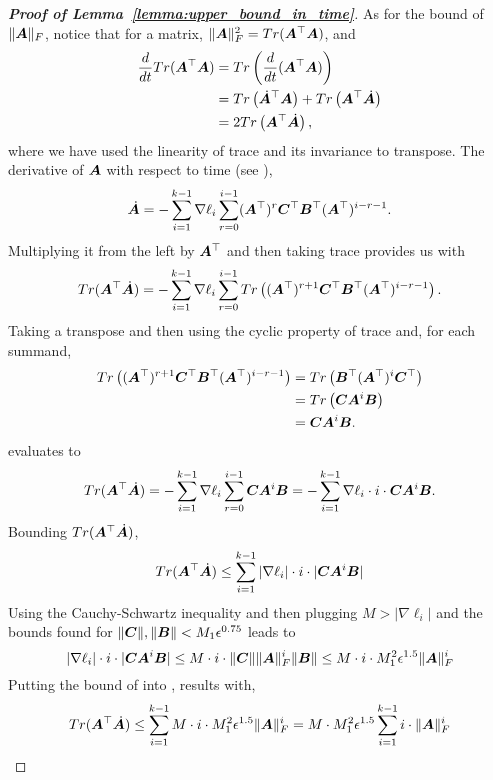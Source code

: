 \begin{proof}[\textbf{Proof of Lemma~\ref{lemma:upper_bound_in_time}}]
As for the bound of $\|{\bm{A}}\|_F$, notice that for a matrix, $\|{\bm{A}}\|_F^2=Tr({\bm{A}}^\top {\bm{A}})$, and
\begin{align}
    \frac{d}{dt}Tr({\bm{A}}^\top {\bm{A}})& =Tr\left(\frac{d}{dt}({\bm{A}}^\top {\bm{A}})\right)\\
    & =Tr\left(\dot{{\bm{A}}}^\top {\bm{A}}\right) + Tr\left({\bm{A}}^\top \dot{{\bm{A}}}\right)\\
    & =2Tr\left( {\bm{A}}^\top \dot{{\bm{A}}} \right),
\end{align}
where we have used the linearity of trace and its invariance to transpose.
The derivative of ${\bm{A}}$ with respect to time (see ),
\begin{equation}
    \dot{{\bm{A}}}=-\sum_{i=1}^{k-1}\nabla\ell_i\sum_{r=0}^{i-1}({\bm{A}}^\top)^r{\bm{C}}^\top {\bm{B}}^\top({\bm{A}}^\top)^{i-r-1}.
\end{equation}
Multiplying it from the left by ${\bm{A}}^\top$ and then taking trace provides us with
\begin{equation}\label{eq:A_trace_deriv}
    Tr({\bm{A}}^\top \dot{{\bm{A}}})=-\sum_{i=1}^{k-1}\nabla\ell_i\sum_{r=0}^{i-1}Tr\left(({\bm{A}}^\top)^{r+1}{\bm{C}}^\top {\bm{B}}^\top({\bm{A}}^\top)^{i-r-1}\right).
\end{equation}
Taking a transpose and then using the cyclic property of trace and, for each summand,
\begin{align}
    Tr\left(({\bm{A}}^\top)^{r+1}{\bm{C}}^\top {\bm{B}}^\top({\bm{A}}^\top)^{i-r-1}\right)&=Tr\left({\bm{B}}^\top ({\bm{A}}^\top)^{i}{\bm{C}}^\top \right)\\
    & =Tr\left({\bm{C}}{\bm{A}}^i{\bm{B}}\right)\\
    & ={\bm{C}}{\bm{A}}^i{\bm{B}}.
\end{align}
 evaluates to
\begin{equation}
    Tr({\bm{A}}^\top \dot{{\bm{A}}})=-\sum_{i=1}^{k-1}\nabla\ell_i\sum_{r=0}^{i-1}{\bm{C}}{\bm{A}}^i{\bm{B}} = -\sum_{i=1}^{k-1}\nabla\ell_i \cdot i\cdot {\bm{C}}{\bm{A}}^i{\bm{B}}.
\end{equation}
Bounding $Tr({\bm{A}}^\top \dot{{\bm{A}}})$,
\begin{equation}\label{eq:trace_bound}
    Tr({\bm{A}}^\top \dot{{\bm{A}}})\le \sum_{i=1}^{k-1}|\nabla\ell_i| \cdot i\cdot |{\bm{C}}{\bm{A}}^i{\bm{B}}|
\end{equation}
%
Using the Cauchy-Schwartz inequality and then plugging $M > |\nabla \ell_i|$ and the bounds found for $\|{\bm{C}}\|, \|{\bm{B}}\|<M_1 \epsilon^{0.75}$ leads to
\begin{equation}\label{eq:A_summand_bound}
    |\nabla\ell_i| \cdot i\cdot |{\bm{C}}{\bm{A}}^i{\bm{B}}| \leq M \cdot i \cdot \|{\bm{C}}\| \|{\bm{A}}\|_F^i \|{\bm{B}}\| \leq M \cdot i \cdot M_1^2 \epsilon^{1.5} \|{\bm{A}}\|_F^i
\end{equation}
Putting the bound of  into , results with,
\begin{equation}
Tr({\bm{A}}^\top \dot{{\bm{A}}})\le \sum_{i=1}^{k-1} M \cdot i \cdot M_1^2 \epsilon^{1.5} \|{\bm{A}}\|_F^i = M \cdot M_1^2 \epsilon^{1.5} \sum_{i=1}^{k-1}  i \cdot  \|{\bm{A}}\|_F^i
\end{equation}



\end{proof}
